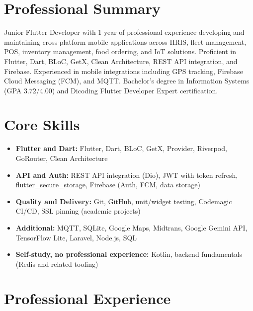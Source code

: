 \documentclass{resume}
\begin{document}
\makecvtitle


\section{Professional Summary}
Junior Flutter Developer with 1 year of professional experience developing and maintaining cross-platform mobile applications across HRIS, fleet management, POS, inventory management, food ordering, and IoT solutions. Proficient in Flutter, Dart, BLoC, GetX, Clean Architecture, REST API integration, and Firebase. Experienced in mobile integrations including GPS tracking, Firebase Cloud Messaging (FCM), and MQTT. Bachelor's degree in Information Systems (GPA 3.72/4.00) and Dicoding Flutter Developer Expert certification.


\section{Core Skills}
\begin{itemize}
\item \textbf{Flutter and Dart:} Flutter, Dart, BLoC, GetX, Provider, Riverpod, GoRouter, Clean Architecture
\item \textbf{API and Auth:} REST API integration (Dio), JWT with token refresh, flutter\_secure\_storage, Firebase (Auth, FCM, data storage)
\item \textbf{Quality and Delivery:} Git, GitHub, unit/widget testing, Codemagic CI/CD, SSL pinning (academic projects)
\item \textbf{Additional:} MQTT, SQLite, Google Maps, Midtrans, Google Gemini API, TensorFlow Lite, Laravel, Node.js, SQL
\item \textbf{Self-study, no professional experience:} Kotlin, backend fundamentals (Redis and related tooling)
\end{itemize}


\section{Professional Experience}
\end{document}
